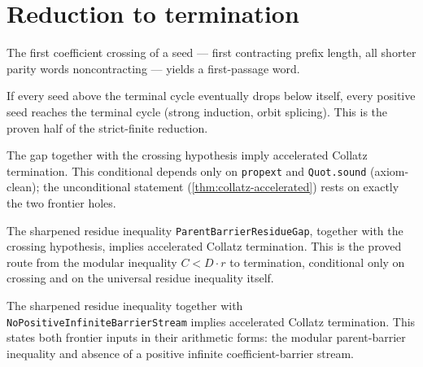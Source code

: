 \section{Reduction to termination}

\begin{theorem}
  \label{thm:collatz-crossing-firstpassage}
  \leanok
  The first coefficient crossing of a seed --- first contracting prefix length, all shorter
  parity words noncontracting --- yields a first-passage word.
\end{theorem}
\begin{theorem}
  \label{thm:collatz-reduction}
  \leanok
  If every seed above the terminal cycle eventually drops below itself, every positive seed
  reaches the terminal cycle (strong induction, orbit splicing). This is the proven half of the
  strict-finite reduction.
\end{theorem}
\begin{theorem}
  \label{thm:collatz-conditional}
  \leanok
  The gap together with the crossing hypothesis imply accelerated Collatz termination. This
  conditional depends only on \texttt{propext} and \texttt{Quot.sound} (axiom-clean); the
  unconditional statement (\cref{thm:collatz-accelerated}) rests on exactly the two frontier
  holes.
\end{theorem}
\begin{theorem}
  \label{thm:collatz-residue-conditional}
  \leanok
  The sharpened residue inequality \texttt{ParentBarrierResidueGap}, together with the
  crossing hypothesis, implies accelerated Collatz termination. This is the proved route from
  the modular inequality $C<D\cdot r$ to termination, conditional only on crossing and on the
  universal residue inequality itself.
\end{theorem}
\begin{theorem}
  \label{thm:collatz-residue-no-infinite-stream}
  \leanok
  The sharpened residue inequality together with
  \texttt{NoPositiveInfiniteBarrierStream} implies accelerated Collatz termination. This
  states both frontier inputs in their arithmetic forms: the modular
  parent-barrier inequality and absence of a positive infinite coefficient-barrier stream.
\end{theorem}

